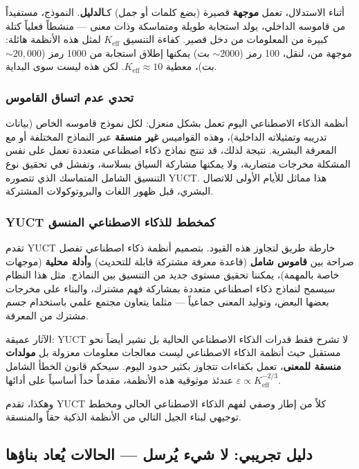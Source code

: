 \documentclass[12pt,a4paper]{article}
\newcommand{\Keff}{K_{\mathrm{eff}}}
\theoremstyle{remark}
\begin{document}
	أثناء الاستدلال، تعمل \textbf{موجهة} قصيرة (بضع كلمات أو جمل) كـ\textbf{الدليل}. النموذج، مستفيداً من قاموسه الداخلي، يولد استجابة طويلة ومتماسكة وذات معنى — منشطاً فعلياً كتلة كبيرة من المعلومات من دخل قصير. كفاءة التنسيق \(\Keff\) لمثل هذه الأنظمة هائلة: موجهة من، لنقل، 100 رمز (\(\sim 2000\) بت) يمكنها إطلاق استجابة من 1000 رمز (\(\sim 20,000\) بت)، معطية \(\Keff \approx 10\). لكن هذه ليست سوى البداية.
	
	\subsubsection{تحدي عدم اتساق القاموس}
	
	أنظمة الذكاء الاصطناعي اليوم تعمل بشكل منعزل: لكل نموذج قاموسه الخاص (بيانات تدريبه وتمثيلاته الداخلية)، وهذه القواميس \textbf{غير منسقة} عبر النماذج المختلفة أو مع المعرفة البشرية. نتيجة لذلك، قد تنتج نماذج ذكاء اصطناعي متعددة تعمل على نفس المشكلة مخرجات متضاربة، ولا يمكنها مشاركة السياق بسلاسة، وتفشل في تحقيق نوع التنسيق الشامل المتماسك الذي تتصوره YUCT. هذا مماثل للأيام الأولى للاتصال البشري، قبل ظهور اللغات والبروتوكولات المشتركة.
	
	\subsubsection{YUCT كمخطط للذكاء الاصطناعي المنسق}
	
	تقدم YUCT خارطة طريق لتجاوز هذه القيود. بتصميم أنظمة ذكاء اصطناعي تفصل صراحة بين \textbf{قاموس شامل} (قاعدة معرفة مشتركة قابلة للتحديث) و\textbf{أدلة محلية} (موجهات خاصة بالمهمة)، يمكننا تحقيق مستوى جديد من التنسيق بين النماذج. مثل هذا النظام سيسمح لنماذج ذكاء اصطناعي متعددة بمشاركة فهم مشترك، والبناء على مخرجات بعضها البعض، وتوليد المعنى جماعياً — مثلما يتعاون مجتمع علمي باستخدام جسم مشترك من المعرفة.
	
	الآثار عميقة: YUCT لا تشرح فقط قدرات الذكاء الاصطناعي الحالية بل تشير أيضاً نحو مستقبل حيث أنظمة الذكاء الاصطناعي ليست معالجات معلومات معزولة بل \textbf{مولدات منسقة للمعنى}، تعمل بكفاءات تتجاوز بكثير حدود اليوم. سيحكم قانون الخطأ الشامل \(\varepsilon \propto K_{\mathrm{eff}}^{-2/3}\) عندئذ موثوقية هذه الأنظمة، مقدماً حداً أساسياً على أدائها.
	
	وهكذا، تقدم YUCT كلاً من إطار وصفي لفهم الذكاء الاصطناعي الحالي ومخطط توجيهي لبناء الجيل التالي من الأنظمة الذكية حقاً والمنسقة.
	
	\subsection{دليل تجريبي: لا شيء يُرسل — الحالات يُعاد بناؤها}
	
\end{document}

